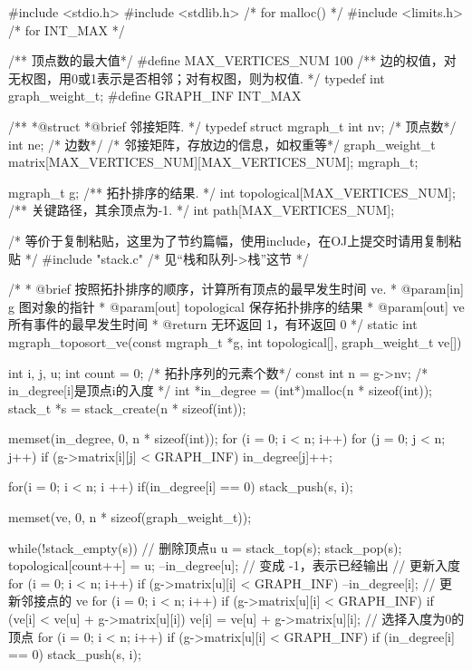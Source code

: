 \begin{Codex}[label=mgraph_critical_path.c]
#include <stdio.h>
#include <stdlib.h>  /* for malloc() */
#include <limits.h>  /* for INT_MAX */

/** 顶点数的最大值*/
#define MAX_VERTICES_NUM 100
/** 边的权值，对无权图，用0或1表示是否相邻；对有权图，则为权值. */
typedef int graph_weight_t;
#define GRAPH_INF INT_MAX

/**
 *@struct
 *@brief 邻接矩阵.
 */
typedef struct mgraph_t {
    int nv; /* 顶点数*/
    int ne; /* 边数*/
    /* 邻接矩阵，存放边的信息，如权重等*/
    graph_weight_t matrix[MAX_VERTICES_NUM][MAX_VERTICES_NUM];
} mgraph_t;

mgraph_t g;
/** 拓扑排序的结果. */
int topological[MAX_VERTICES_NUM];
/** 关键路径，其余顶点为-1. */
int path[MAX_VERTICES_NUM];

/* 等价于复制粘贴，这里为了节约篇幅，使用include，在OJ上提交时请用复制粘贴 */
#include "stack.c"  /* 见“栈和队列->栈”这节 */

/*
  * @brief 按照拓扑排序的顺序，计算所有顶点的最早发生时间 ve.
  * @param[in] g 图对象的指针
  * @param[out] topological 保存拓扑排序的结果
  * @param[out] ve 所有事件的最早发生时间
  * @return 无环返回 1，有环返回 0
  */
static int mgraph_toposort_ve(const mgraph_t *g, int topological[],
        graph_weight_t ve[]) {
    int i, j, u;
    int count = 0; /* 拓扑序列的元素个数*/
    const int n = g->nv;
    /* in_degree[i]是顶点i的入度 */
    int *in_degree = (int*)malloc(n * sizeof(int));
    stack_t *s = stack_create(n * sizeof(int));

    memset(in_degree, 0, n * sizeof(int));
    for (i = 0; i < n; i++) {
        for (j = 0; j < n; j++) {
            if (g->matrix[i][j] < GRAPH_INF)
                in_degree[j]++;
        }
    }

    for(i = 0; i < n; i ++) {
        if(in_degree[i] == 0) {
            stack_push(s, i);
        }
    }

    memset(ve, 0, n * sizeof(graph_weight_t));

    while(!stack_empty(s)) {
        // 删除顶点u
        u = stack_top(s); stack_pop(s);
        topological[count++] = u;
        --in_degree[u];  // 变成 -1，表示已经输出
        // 更新入度
        for (i = 0; i < n; i++) if (g->matrix[u][i] < GRAPH_INF) {
            --in_degree[i];
        }
        // 更新邻接点的 ve
        for (i = 0; i < n; i++) if (g->matrix[u][i] < GRAPH_INF) {
            if (ve[i] < ve[u] + g->matrix[u][i])
                ve[i] = ve[u] + g->matrix[u][i];
        }
        // 选择入度为0的顶点
        for (i = 0; i < n; i++) if (g->matrix[u][i] < GRAPH_INF) {
            if (in_degree[i] == 0) stack_push(s, i);
        }
    }

}
\end{Codex}
